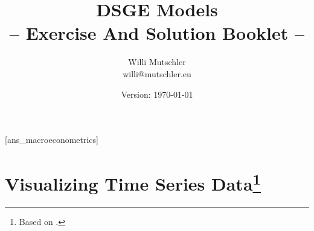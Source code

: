\documentclass[a4paper]{scrartcl}
\newif\ifpartINTRO
\newif\ifpartTSA
\newcommand{\myTitle}{
    DSGE Models
}
\begin{document}
\title{\myTitle\\ -- Exercise And Solution Booklet --}
\author{Willi Mutschler\\willi@mutschler.eu}
\date{Version: \today}
\maketitle\thispagestyle{empty}
\newpage
{}[ans_macroeconometrics]
\renewcommand{\contentsname}{Overview}
\tableofcontents\thispagestyle{empty}\newpage

\ifpartINTRO	%
    \section[Macroeconometrics]{
      Macroeconometrics\footnote{Based on \cite{Schorfheide.2010} and \cite{FernandezVillaverdeRubioRamirez.2010}.}
      \label{ex:Macroeconometrics}
     }
    \setcounter{page}{1}
    
\fi  %


\ifpartTSA  %
    \section[Visualizing Time Series Data]{
      Visualizing Time Series Data\footnote{Based on \citet[Ch.~1]{BjornlandThorsrud.2015}.}}
    \label{ex:VisualizingTSData}
    
    
\end{document}
